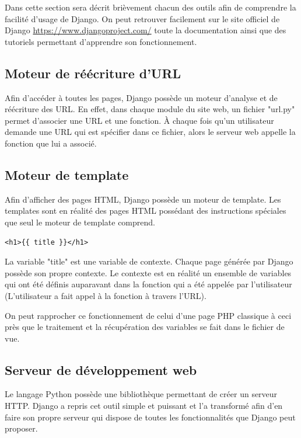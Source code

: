 \documentclass[twoside,UTF8]{EPURapport}
\begin{document}
Dans cette section sera décrit brièvement chacun des outils afin de comprendre la facilité d'usage de Django. On peut retrouver facilement sur le site officiel de Django \url{https://www.djangoproject.com/} toute la documentation ainsi que des tutoriels permettant d'apprendre son fonctionnement.

    \subsection{Moteur de réécriture d'URL}
Afin d'accéder à toutes les pages, Django possède un moteur d'analyse et de réécriture des URL. En effet, dans chaque module du site web, un fichier "url.py" permet d'associer une URL et une fonction. À chaque fois qu'un utilisateur demande une URL qui est spécifier dans ce fichier, alors le serveur web appelle la fonction que lui a associé.

    \subsection{Moteur de template}
Afin d'afficher des pages HTML, Django possède un moteur de template. Les templates sont en réalité des pages HTML possédant des instructions spéciales que seul le moteur de template comprend.

\lstset{language=HTML}
\begin{lstlisting}
<h1>{{ title }}</h1>
\end{lstlisting}

La variable "title" est une variable de contexte. Chaque page générée par Django possède son propre contexte. Le contexte est en réalité un ensemble de variables qui ont été définis auparavant dans la fonction qui a été appelée par l'utilisateur (L'utilisateur a fait appel à la fonction à travers l'URL).

On peut rapprocher ce fonctionnement de celui d'une page PHP classique à ceci près que le traitement et la récupération des variables se fait dans le fichier de vue.

    \subsection{Serveur de développement web}
Le langage Python possède une bibliothèque permettant de créer un serveur HTTP. Django a repris cet outil simple et puissant et l'a transformé afin d'en faire son propre serveur qui dispose de toutes les fonctionnalités que Django peut proposer.
\end{document}
